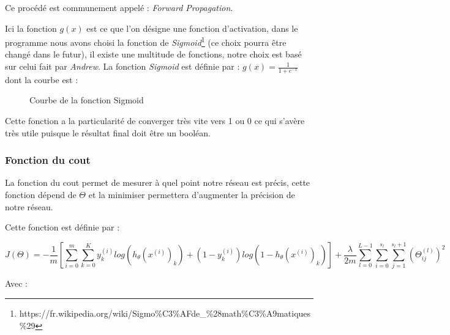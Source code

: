 Ce procédé est communement appelé : \textit{Forward Propagation}.

Ici la fonction $g(x)$ est ce que l'on désigne une fonction d'activation, dans le programme nous avons choisi la fonction de \textit{Sigmoid}\footnote{https://fr.wikipedia.org/wiki/Sigmo\%C3\%AFde\_\%28math\%C3\%A9matiques\%29} (ce choix pourra être changé dans le futur), il existe une multitude de fonctions, notre choix est basé sur celui fait par \textit{Andrew}.
La fonction \textit{Sigmoid} est définie par : $g(x) = \frac{1}{1 + e^{-x}}$ dont la courbe est :

\begin{figure}[h]
\centering
{}
\caption{Courbe de la fonction Sigmoid}
\end{figure}

Cette fonction a la particularité de converger très vite vers 1 ou 0 ce qui s'avère très utile puisque le résultat final doit être un booléan.

\subsubsection{Fonction du cout}

La fonction du cout permet de mesurer à quel point notre réseau est précis, cette fonction dépend de $\Theta$ et la minimiser permettera d'augmenter la précision de notre réseau.

Cette fonction est définie par :

\begin{equation}
J(\Theta) = -\frac{1}{m}[\sum\limits_{i=0}^m\sum\limits_{k=0}^K y_k^{(i)}log(h_\theta(x^{(i)})_k) + (1 - y_k^{(i)})log(1 - h_\theta(x^{(i)})_k)] + \frac{\lambda}{2m}\sum\limits_{l=0}^{L - 1}\sum\limits_{i=0}^{s_l}\sum\limits_{j=1}^{s_l + 1}(\Theta_{ij}^{(l)})^2
\end{equation}

Avec :

